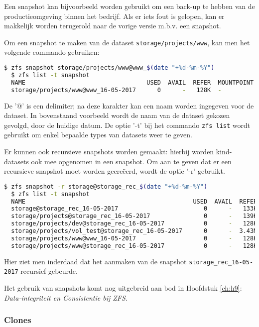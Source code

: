 Een snapshot kan bijvoorbeeld worden gebruikt om een back-up te hebben van de productieomgeving binnen het bedrijf. Als er iets fout is gelopen, kan er makkelijk worden terugerold naar de vorige versie m.b.v. een snapshot. 

Om een snapshot te maken van de dataset \texttt{storage/projects/www}, kan men het volgende commando gebruiken:

\begin{lstlisting}[language=bash,style=command_style] 
  $ zfs snapshot storage/projects/www@www_$(date "+%d-%m-%Y")
  $ zfs list -t snapshot
  NAME                                  USED  AVAIL  REFER  MOUNTPOINT
  storage/projects/www@www_16-05-2017      0      -   128K  -
\end{lstlisting}

De '@' is een delimiter; na deze karakter kan een naam worden ingegeven voor de dataset. In bovenstaand voorbeeld wordt de naam van de dataset gekozen gevolgd, door de huidige datum. De optie '-t' bij het commando \texttt{zfs list} wordt gebruikt om enkel bepaalde types van datasets weer te geven.

Er kunnen ook recursieve snapshots worden gemaakt: hierbij worden kind-datasets ook mee opgenomen in een snapshot. Om aan te geven dat er een recursieve snapshot moet worden gecreëerd, wordt de optie '-r' gebruikt.

\begin{lstlisting}[language=bash,style=command_style] 
  $ zfs snapshot -r storage@storage_rec_$(date "+%d-%m-%Y")
  $ zfs list -t snapshot
  NAME                                               USED  AVAIL  REFER  MOUNTPOINT
  storage@storage_rec_16-05-2017                        0      -   133K  -
  storage/projects@storage_rec_16-05-2017               0      -   139K  -
  storage/projects/dev@storage_rec_16-05-2017           0      -   128K  -
  storage/projects/vol_test@storage_rec_16-05-2017      0      -  3.43M  -
  storage/projects/www@www_16-05-2017                   0      -   128K  -
  storage/projects/www@storage_rec_16-05-2017           0      -   128K  -
\end{lstlisting}

Hier ziet men inderdaad dat het aanmaken van de snapshot \texttt{storage\_rec\_16-05-2017} recursief gebeurde.

Het gebruik van snapshots komt nog uitgebreid aan bod in Hoofdstuk \ref{ch:h9}: \textit{Data-integriteit en Consistentie bij ZFS}.

\subsubsection{Clones}

